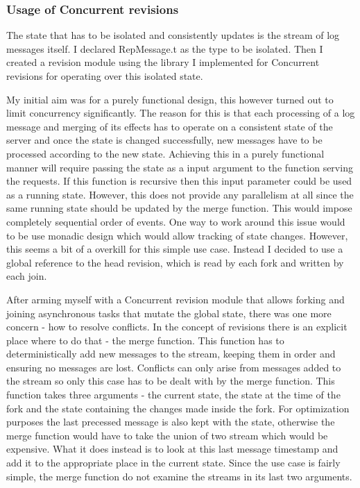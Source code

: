 \documentclass[12pt,twoside,notitlepage]{report}
\begin{document}
\subsubsection{Usage of Concurrent revisions}

The state that has to be isolated and consistently updates is the stream of log messages itself. I declared {RepMessage.t} as the type to be isolated. Then I created a revision module using the library I implemented for Concurrent revisions for operating over this isolated state. 

My initial aim was for a purely functional design, this however turned out to limit concurrency significantly. The reason for this is that each processing of a log message and merging of its effects has to operate on a consistent state of the server and once the state is changed successfully, new messages have to be processed according to the new state.  Achieving this in a purely functional manner will require passing the state as a input argument to the function serving the requests. If this function is recursive then this input parameter could be used as a running state. However, this does not provide any parallelism at all since the same running state should be updated by the merge function. This would impose completely sequential order of events. One way to work around this issue would to be use monadic design which would allow tracking of state changes. However, this seems a bit of a overkill for this simple use case. Instead I decided to use a global reference to the head revision, which is read by each fork and written by each join.

After arming myself with a Concurrent revision module that allows forking and joining asynchronous tasks that mutate the global state, there was one more concern - how to resolve conflicts. In the concept of revisions there is an explicit place where to do that - the merge function. This function has to deterministically add new messages to the stream, keeping them in order and ensuring no messages are lost. Conflicts can only arise from messages added to the stream so only this case has to be dealt with by the merge function. This function takes three arguments - the current state, the state at the time of the fork and the state containing the changes made inside the fork. For optimization purposes the last precessed message is also kept with the state, otherwise the merge function would have to take the union of two stream which would be expensive. What it does instead is to look at this last message timestamp and add it to the appropriate place in the current state. Since the use case is fairly simple, the merge function do not examine the streams in its last two arguments.
\end{document}
